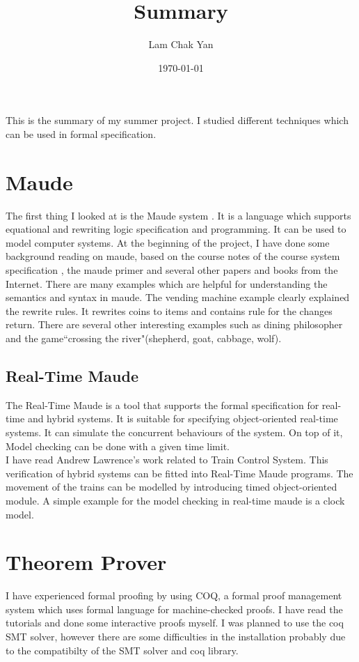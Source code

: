 \documentclass{article}
\begin{document}
\title{Summary}
\author{Lam Chak Yan}
\date{\today}
\maketitle
This is the summary of my summer project. I studied different techniques which can be used in formal specification. 
\section{Maude}
The first thing I looked at is the Maude system \cite{maude}. It is a language which supports equational and rewriting logic specification and programming. It can be used to model computer systems. 
At the beginning of the project, I have done some background reading on maude, based on the course notes of the course system specification \cite{ss}, the maude primer \cite{primer} and several other papers and books \cite{james2014verification} \cite{olveczky2004specification} \cite{clavel2007all} from the Internet. There are many examples which are helpful for understanding the semantics and syntax in maude. The vending machine example clearly explained the rewrite rules. It rewrites coins to items and contains rule for  the changes return. There are several other interesting examples such as dining philosopher and the game``crossing the river"(shepherd, goat, cabbage, wolf).

\subsection{Real-Time Maude}
The Real-Time Maude \cite{rtmaude} is a tool that supports the formal specification for real-time and hybrid systems. It is suitable for specifying object-oriented real-time systems. It can simulate the concurrent behaviours of the system. On top of it, Model checking can be done with a given time limit.
\\I have read Andrew Lawrence's work related to Train Control System.  This verification of hybrid systems can be fitted into Real-Time Maude programs.
The movement of the trains can be modelled by introducing timed object-oriented module. A simple example for the model checking in real-time maude is a clock model. 

\section{Theorem Prover}
I have experienced formal proofing by using COQ, a formal proof management system which uses formal language for machine-checked proofs. I have read the tutorials \cite{coq} and done some interactive proofs myself. I was planned to use the coq SMT solver, however there are some difficulties in the installation probably due to the compatibilty of the SMT solver and coq library.
\end{document}
